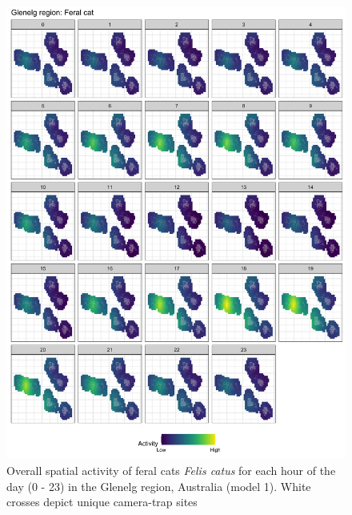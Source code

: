 \documentclass[11pt,a4paper,titlepage,twoside,openright]{style/unimelbthesis}
\begin{document}
\begin{mainmatter}
\begin{figure}
{\centering \includegraphics[width=1\linewidth]{figure/spte_facet_g_cat} 

}

\caption{Overall spatial activity of feral cats \textit{Felis catus} for each hour of the day (0 - 23) in the Glenelg region, Australia (model 1). White crosses depict unique camera-trap sites}\label{fig:diel-space-g-cat}
\end{figure}
\newpage
\begin{figure}


\end{figure}
\end{mainmatter}
\end{document}
